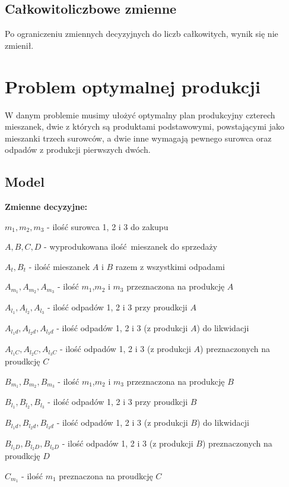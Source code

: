 \documentclass[12pt, a4paper]{article}
\begin{document}
\subsection{Całkowitoliczbowe zmienne}

Po ograniczeniu zmiennych decyzyjnych do liczb całkowitych, wynik się nie zmienił.

\section{Problem optymalnej produkcji}

W danym problemie musimy ułożyć optymalny plan produkcyjny czterech mieszanek, dwie z których są produktami
podstawowymi, powstającymi jako mieszanki trzech surowców, a dwie inne wymagają pewnego surowca oraz odpadów z produkcji pierwszych dwóch.

\subsection{Model}

\textbf{Zmienne decyzyjne:}

$m_1, m_2, m_3$ - ilość surowca 1, 2 i 3 do zakupu

$A, B, C, D$ - wyprodukowana ilość mieszanek do sprzedaży

$A_t, B_t$ - ilość mieszanek $A$ i $B$ razem z wszystkimi odpadami

$A_{m_1}, A_{m_2}, A_{m_3}$ - ilość $m_1$,$m_2$ i $m_3$ przeznaczona na produkcję $A$

$A_{l_1}, A_{l_2}, A_{l_3}$ - ilość odpadów 1, 2 i 3 przy proudkcji $A$

$A_{l_1d}, A_{l_2d}, A_{l_3d}$ - ilość odpadów 1, 2 i 3 (z produkcji $A$) do likwidacji

$A_{l_1C}, A_{l_2C}, A_{l_3C}$ - ilość odpadów 1, 2 i 3 (z produkcji $A$) preznaczonych na proudkcję $C$


$B_{m_1}, B_{m_2}, B_{m_3}$ - ilość $m_1$,$m_2$ i $m_3$ przeznaczona na produkcję $B$

$B_{l_1}, B_{l_2}, B_{l_3}$ - ilość odpadów 1, 2 i 3 przy proudkcji $B$

$B_{l_1d}, B_{l_2d}, B_{l_3d}$ - ilość odpadów 1, 2 i 3 (z produkcji $B$) do likwidacji

$B_{l_1D}, B_{l_2D}, B_{l_3D}$ - ilość odpadów 1, 2 i 3 (z produkcji $B$) preznaczonych na proudkcję $D$

$C_{m_1}$ - ilość $m_1$ preznaczona na proudkcję $C$
\end{document}
